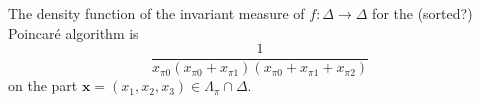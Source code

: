 The density function of the invariant measure of $f:\Delta\to\Delta$ for
the (sorted?) Poincar\'e algorithm is \cite{schweiger}
\[
\frac{1}{x_{\pi 0}(x_{\pi 0}+x_{\pi 1})(x_{\pi 0}+x_{\pi 1}+x_{\pi 2})}
\]
on the part $\mathbf{x}=(x_1,x_2,x_3)\in\Lambda_\pi\cap\Delta$.
